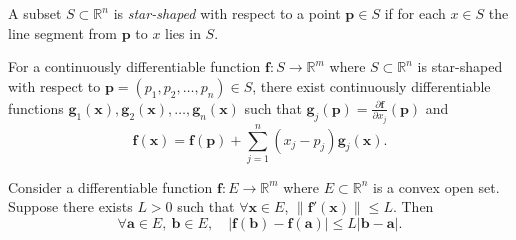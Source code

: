 \begin{defn}
  \label{def:starShapedSet}
  A subset $S\subset \mathbb{R}^n$ is \emph{star-shaped} with
  respect to a point $\mathbf{p}\in S$ if for each $x\in S$
  the line segment from $\mathbf{p}$ to $x$ lies in $S$.
\end{defn}

\begin{thm}
  \label{thm:meanValueVectorSimilar}
  For a continuously differentiable function
  $\mathbf{f}: S\rightarrow \mathbb{R}^m$
  where $S\subset \mathbb{R}^n$
  is star-shaped with respect to $\mathbf{p}=(p_1,p_2,\ldots,p_n)\in S$, 
  there exist continuously differentiable functions
  $\mathbf{g}_1(\mathbf{x}),
  \mathbf{g}_2(\mathbf{x}), \ldots, \mathbf{g}_n(\mathbf{x})$
  such that
  $\mathbf{g}_j(\mathbf{p}) = \frac{\partial \mathbf{f}}{\partial x_j}(\mathbf{p})$
  and 
  \begin{equation}
    \label{eq:meanValueVectorSimilar}
    \mathbf{f}(\mathbf{x}) = \mathbf{f}(\mathbf{p})
    + \sum_{j=1}^n(x_j-p_j) \mathbf{g}_j(\mathbf{x}). 
  \end{equation}
\end{thm}



\begin{thm}
  \label{thm:C1impliesLipschitzContinuity}
  Consider a differentiable function
  $\mathbf{f}: E\rightarrow \mathbb{R}^m$
  where $E\subset \mathbb{R}^n$ is a convex open set.
  Suppose there exists $L>0$ such that
  $\forall \mathbf{x}\in E$, $\|\mathbf{f}'(\mathbf{x})\|\le L$.
  Then
  \begin{equation}
    \label{eq:C1impliesLipschitzContinuity}
    \forall \mathbf{a}\in E,\ \mathbf{b}\in E,\quad
    |\mathbf{f}(\mathbf{b})-\mathbf{f}(\mathbf{a})|
    \le L |\mathbf{b}-\mathbf{a}|. 
  \end{equation}
\end{thm}


